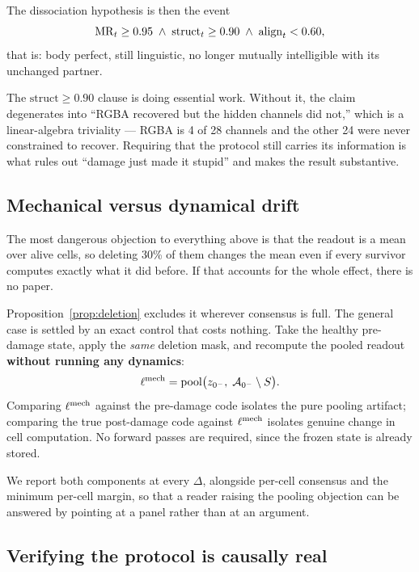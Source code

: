 The dissociation hypothesis is then the event
%
\begin{equation}
  \label{eq:h3}
  \mathrm{MR}_t \geq 0.95 \;\wedge\; \mathrm{struct}_t \geq 0.90 \;\wedge\;
  \mathrm{align}_t < 0.60 ,
\end{equation}
%
that is: body perfect, still linguistic, no longer mutually intelligible with its
unchanged partner.

The $\mathrm{struct} \geq 0.90$ clause is doing essential work. Without it, the
claim degenerates into ``RGBA recovered but the hidden channels did not,'' which
is a linear-algebra triviality --- RGBA is 4 of 28 channels and the other 24 were
never constrained to recover. Requiring that the protocol still carries its
information is what rules out ``damage just made it stupid'' and makes the result
substantive.

\subsection{Mechanical versus dynamical drift}
\label{sec:mechanical}

The most dangerous objection to everything above is that the readout is a mean
over alive cells, so deleting 30\% of them changes the mean even if every
survivor computes exactly what it did before. If that accounts for the whole
effect, there is no paper.

Proposition~\ref{prop:deletion} excludes it wherever consensus is full. The
general case is settled by an exact control that costs nothing. Take the healthy
pre-damage state, apply the \emph{same} deletion mask, and recompute the pooled
readout \textbf{without running any dynamics}:
%
\begin{equation}
  \ell^{\mathrm{mech}} = \mathrm{pool}\big(z_{0^{-}},\; \mathcal{A}_{0^{-}} \setminus S\big).
\end{equation}
%
Comparing $\ell^{\mathrm{mech}}$ against the pre-damage code isolates the pure
pooling artifact; comparing the true post-damage code against
$\ell^{\mathrm{mech}}$ isolates genuine change in cell computation. No forward
passes are required, since the frozen state is already stored.

We report both components at every $\Delta$, alongside per-cell consensus and the
minimum per-cell margin, so that a reader raising the pooling objection can be
answered by pointing at a panel rather than at an argument.

\subsection{Verifying the protocol is causally real}

